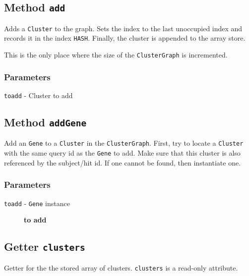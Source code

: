 \subsection*{Method \texttt{add}\label{Method_add}}


Adds a \texttt{Cluster} to the graph. Sets the index to the last unoccupied index
and records it in the index \texttt{HASH}. Finally, the cluster is appended to the
array store.



This is the only place where the size of the \texttt{ClusterGraph} is incremented.

\subsubsection*{Parameters\label{Parameters}}
\begin{description}

\item[{\texttt{toadd} - Cluster to add}] \mbox{}\end{description}
\subsection*{Method \texttt{addGene}\label{Method_addGene}}


Add an \texttt{Gene} to a \texttt{Cluster} in the \texttt{ClusterGraph}. First, try to locate a
\texttt{Cluster} with the same query id as the \texttt{Gene} to add. Make sure that this
cluster is also referenced by the subject/hit id. If one cannot be found,
then instantiate one.

\subsubsection*{Parameters\label{Parameters}}
\begin{description}

\item[{\texttt{toadd} - \texttt{Gene} instance}] \textbf{to add}\end{description}
\subsection*{Getter \texttt{clusters}\label{Getter_clusters}}


Getter for the the stored array of clusters. \texttt{clusters} is a read-only attribute.

